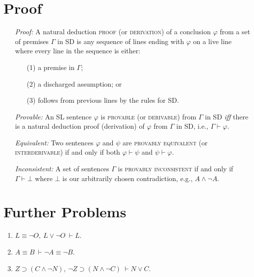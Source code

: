 \documentclass[a4paper, 11pt]{article} %
\begin{document}
\section*{Proof}

\begin{enumerate}
  \item[\it Proof:] A natural deduction \textsc{proof} (or \textsc{derivation}) of a conclusion $\varphi$ from a set of premises $\Gamma$ in SD is any sequence of lines ending with $\varphi$ on a live line where every line in the sequence is either:
      \begin{itemize}
        \item[(1)] a premise in $\Gamma$; 
        \item[(2)] a discharged assumption; or
        \item[(3)] follows from previous lines by the rules for SD.
      \end{itemize}
  \item[\it Provable:] An SL sentence $\varphi$ is \textsc{provable} (or \textsc{derivable}) from $\Gamma$ in SD \textit{iff} there is a natural deduction proof (derivation) of $\varphi$ from $\Gamma$ in SD, i.e., $\Gamma \vdash \varphi$. 
  \item[\it Equivalent:] Two sentences $\varphi$ and $\psi$ are \textsc{provably equivalent} (or \textsc{interderivable}) if and only if both $\varphi\vdash\psi$ and $\psi\vdash\varphi$.
  \item[\it Inconsistent:] A set of sentences $\Gamma$ is \textsc{provably inconsistent} if and only if $\Gamma\vdash\bot$ where $\bot$ is our arbitrarily chosen contradiction, e.g., $A\wedge\neg A$.
\end{enumerate}



\section*{Further Problems}

\begin{enumerate}
  \item $L\equiv \neg O,\ L\vee \neg O\ \vdash L$.
  \item $A\equiv B\ \vdash \neg A\equiv\neg B$.
  \item $Z \supset (C \wedge \neg N),\ \neg Z \supset (N \wedge \neg C)\ \vdash N \vee C$.
\end{enumerate}
\end{document}
